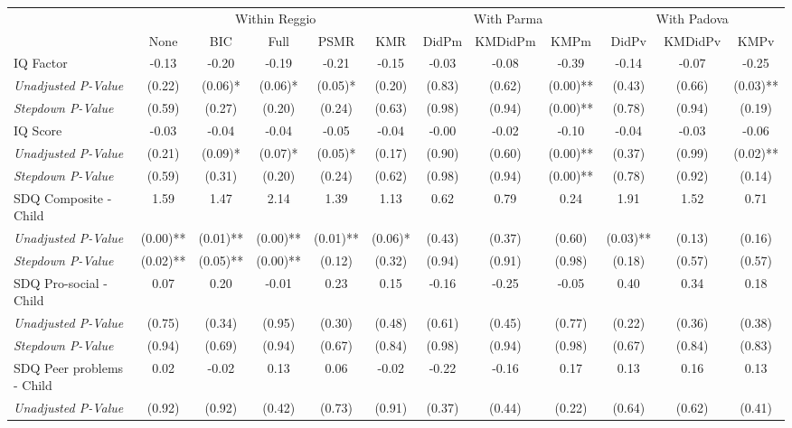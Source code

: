 \begin{tabular}{l c c c c c c c c c c c}
\toprule
& \multicolumn{5}{c}{Within Reggio} & \multicolumn{3}{c}{With Parma} & \multicolumn{3}{c}{With Padova} \\\cmidrule(lr){2-6} \cmidrule(lr){7-9} \cmidrule(lr){10-12}
 & None & BIC & Full & PSMR & KMR & DidPm & KMDidPm & KMPm & DidPv & KMDidPv & KMPv \\
\midrule
IQ Factor & -0.13 & -0.20 & -0.19 & -0.21 & -0.15 & -0.03 & -0.08 & -0.39 & -0.14 & -0.07 & -0.25 \\
\quad \textit{Unadjusted P-Value} & (0.22) & (0.06)* & (0.06)* & (0.05)* & (0.20) & (0.83) & (0.62) & (0.00)** & (0.43) & (0.66) & (0.03)** \\
\quad \textit{Stepdown P-Value} & (0.59) & (0.27) & (0.20) & (0.24) & (0.63) & (0.98) & (0.94) & (0.00)** & (0.78) & (0.94) & (0.19) \\
IQ Score & -0.03 & -0.04 & -0.04 & -0.05 & -0.04 & -0.00 & -0.02 & -0.10 & -0.04 & -0.03 & -0.06 \\
\quad \textit{Unadjusted P-Value} & (0.21) & (0.09)* & (0.07)* & (0.05)* & (0.17) & (0.90) & (0.60) & (0.00)** & (0.37) & (0.99) & (0.02)** \\
\quad \textit{Stepdown P-Value} & (0.59) & (0.31) & (0.20) & (0.24) & (0.62) & (0.98) & (0.94) & (0.00)** & (0.78) & (0.92) & (0.14) \\
SDQ Composite - Child & 1.59 & 1.47 & 2.14 & 1.39 & 1.13 & 0.62 & 0.79 & 0.24 & 1.91 & 1.52 & 0.71 \\
\quad \textit{Unadjusted P-Value} & (0.00)** & (0.01)** & (0.00)** & (0.01)** & (0.06)* & (0.43) & (0.37) & (0.60) & (0.03)** & (0.13) & (0.16) \\
\quad \textit{Stepdown P-Value} & (0.02)** & (0.05)** & (0.00)** & (0.12) & (0.32) & (0.94) & (0.91) & (0.98) & (0.18) & (0.57) & (0.57) \\
SDQ Pro-social - Child & 0.07 & 0.20 & -0.01 & 0.23 & 0.15 & -0.16 & -0.25 & -0.05 & 0.40 & 0.34 & 0.18 \\
\quad \textit{Unadjusted P-Value} & (0.75) & (0.34) & (0.95) & (0.30) & (0.48) & (0.61) & (0.45) & (0.77) & (0.22) & (0.36) & (0.38) \\
\quad \textit{Stepdown P-Value} & (0.94) & (0.69) & (0.94) & (0.67) & (0.84) & (0.98) & (0.94) & (0.98) & (0.67) & (0.84) & (0.83) \\
SDQ Peer problems - Child & 0.02 & -0.02 & 0.13 & 0.06 & -0.02 & -0.22 & -0.16 & 0.17 & 0.13 & 0.16 & 0.13 \\
\quad \textit{Unadjusted P-Value} & (0.92) & (0.92) & (0.42) & (0.73) & (0.91) & (0.37) & (0.44) & (0.22) & (0.64) & (0.62) & (0.41) \\

\end{tabular}
